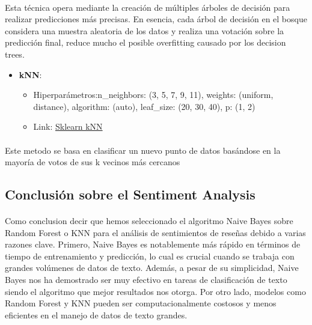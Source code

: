 \documentclass{report}
\begin{document}
{{                \paragraph*{} {
                Esta técnica opera mediante la creación de múltiples árboles de decisión para realizar predicciones más precisas. En esencia, cada árbol de decisión en el bosque considera una muestra aleatoria de los datos y realiza una votación sobre la predicción final, reduce mucho el posible overfitting causado por los decision trees. 
                }
                \begin{itemize}
                    \item\textbf{kNN}:
                    \begin{itemize}
                        \item {Hiperparámetros:n\_neighbors: (3, 5, 7, 9, 11), weights: (uniform, distance), algorithm: (auto), leaf\_size: (20, 30, 40), p: (1, 2)}
                        \item Link: \href{https://scikit-learn.org/stable/modules/generated/sklearn.neighbors.KNeighborsClassifier.html}{Sklearn kNN}
                    \end{itemize} 
                \end{itemize}
                \paragraph*{}{
                Este metodo se basa en clasificar un nuevo punto de datos basándose en la mayoría de votos de sus k vecinos más cercanos
                }
            \subsection{Conclusión sobre el Sentiment Analysis}
                \paragraph*{}{
                    Como conclusion decir que
                    hemos seleccionado el algoritmo Naive Bayes sobre Random Forest o KNN para el análisis de sentimientos de reseñas debido a varias razones clave. Primero, Naive Bayes es notablemente más rápido en términos de tiempo de entrenamiento y predicción, lo cual es crucial cuando se trabaja con grandes volúmenes de datos de texto. Además, a pesar de su simplicidad, Naive Bayes nos ha demostrado ser muy efectivo en tareas de clasificación de texto siendo el algoritmo que mejor resultados nos otorga. Por otro lado, modelos como Random Forest y KNN pueden ser computacionalmente costosos y menos eficientes en el manejo de datos de texto grandes.
                }
}}
\end{document}
